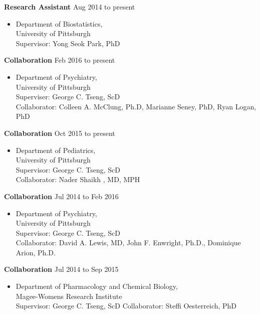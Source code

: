 \documentclass[10pt]{article}
\newenvironment{innerlist}[1][\enskip\textbullet]%
        {\begin{itemize}[#1,leftmargin=*,parsep=0pt,itemsep=0pt,topsep=0pt,partopsep=0pt]}
        {\end{itemize}}
\begin{document}
\textbf{Research Assistant} \hfill {Aug 2014 to present}
\begin{innerlist}

\item[] Department of Biostatistics,\\
        University of Pittsburgh\\
        Supervisor: Yong Seok Park, PhD
\end{innerlist}

\textbf{Collaboration} \hfill {Feb 2016 to present}
\begin{innerlist}

\item[] Department of Psychiatry,\\
        University of Pittsburgh\\
        Superviser: George C. Tseng, ScD\\
        Collaborator: Colleen A. McClung, Ph.D,  Marianne Seney, PhD, Ryan Logan, PhD
\end{innerlist}

\textbf{Collaboration} \hfill {Oct 2015 to present}
\begin{innerlist}

\item[] Department of Pediatrics,\\
        University of Pittsburgh\\
        Supervisor: George C. Tseng, ScD	\\
        Collaborator: Nader Shaikh , MD, MPH
\end{innerlist}

\textbf{Collaboration} \hfill {Jul 2014 to Feb 2016}
\begin{innerlist}

\item[] Department of Psychiatry,\\
        University of Pittsburgh\\
        Supervisor:  George C. Tseng, ScD	\\
        Collaborator: David A. Lewis, MD, John F. Enwright, Ph.D., Dominique Arion, Ph.D.        
\end{innerlist}

\textbf{Collaboration} \hfill {Jul 2014 to Sep 2015}
\begin{innerlist}
\item[]  Department of Pharmacology and Chemical Biology,\\
        Magee-Womens Research Institute\\
        Supervisor:  George C. Tseng, ScD
        Collaborator: Steffi Oesterreich, PhD
\end{innerlist}
\end{document}
